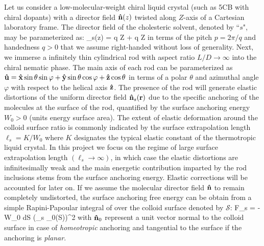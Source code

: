 Let us consider a low-molecular-weight chiral liquid crystal (such as 5CB with chiral dopants) with a director field ${\bf \hat{n}}(z)$ twisted along $Z$-axis of a Cartesian laboratory frame. The director field of the cholesteric solvent, denoted by ``$s$",  may be parameterized as:
\beq
\bn_{s}(z) = \bx \cos q Z  + \by \sin q Z
\label{ns}
\eeq
in terms of the pitch  $p = 2 \pi/q$ and handedness $q>0$ that we assume right-handed without loss of generality.
Next, we immerse a infinitely thin cylindrical rod with aspect ratio $L/D \rightarrow \infty$ into the chiral nematic  phase. The main axis of each rod can be parameterized as ${\bf \hat{u}} = {\bf \hat{x}} \sin \theta \sin \varphi + {\bf \hat{y}} \sin \theta \cos \varphi + {\bf \hat{z}} \cos \theta $ in terms of a polar $\theta$ and azimuthal angle $\varphi$ with respect to the helical axis ${\bf \hat{z}}$. The presence of the rod will generate elastic distortions of the uniform director field ${\bf \hat{n}}_{s}({\bf r})$ due to the specific anchoring of the molecules at the surface of the rod, quantified by  the surface anchoring energy  $W_{0}>0$ (units energy surface area). The extent of elastic deformation around the colloid surface ratio is commonly indicated by the surface extrapolation length $\ell_{s} = K/W_{0}$ where $K$ designates the typical elastic constant of the thermotropic liquid crystal.   In this project we focus on  the regime of large surface extrapolation length $ ( \ell_{s} \rightarrow \infty )$, in which case the elastic distortions are infinitesimally weak and the main energetic contribution imparted by the rod inclusions stems from the surface anchoring energy. Elastic corrections will be accounted for later on.   If we assume the molecular director field  ${\bf \hat{n}}$ to remain completely undistorted,  the surface anchoring free energy can be obtain from a simple Rapini-Papoular integral of  over the colloid surface denoted by ${\mathcal S}$:
\beq
F_{s} = - W_{0} \oint d{\mathcal S}  (\bn_{s} \cdot \bn_{0}({\mathcal S}))^{2}
\label{rapo}
\eeq
with ${\bf \hat{n}}_{0}$ represent a unit vector normal to the colloid surface in case of {\em homeotropic} anchoring and tangential to the surface if the anchoring is {\em planar}.


